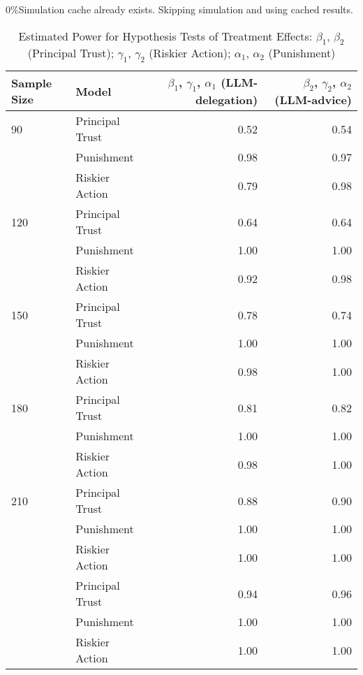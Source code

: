 \documentclass[
]{article}
\begin{document}
\textbar{} \textbar{} \textbar{} 0\%Simulation cache already exists.
Skipping simulation and using cached results.

\begin{table}[!h]

\caption{\label{tab:plot_power}Estimated Power for Hypothesis Tests of Treatment Effects: $\beta_1$, $\beta_2$ (Principal Trust); $\gamma_1$, $\gamma_2$ (Riskier Action); $\alpha_1$, $\alpha_2$ (Punishment)}
\centering
\fontsize{10}{12}\selectfont
\begin{tabular}{llrr}
\toprule
Sample Size & Model & $\beta_1$, $\gamma_1$, $\alpha_1$ (LLM-delegation) & $\beta_2$, $\gamma_2$, $\alpha_2$ (LLM-advice)\\
[1.5ex]
\midrule
90 & Principal Trust & 0.52 & 0.54\\
[1.5ex]
 & Punishment & 0.98 & 0.97\\
[1.5ex]
 & Riskier Action & 0.79 & 0.98\\
[1.5ex]
120 & Principal Trust & 0.64 & 0.64\\
[1.5ex]
 & Punishment & 1.00 & \vphantom{4} 1.00\\
[1.5ex]
\addlinespace
 & Riskier Action & 0.92 & 0.98\\
[1.5ex]
150 & Principal Trust & 0.78 & 0.74\\
[1.5ex]
 & Punishment & 1.00 & \vphantom{3} 1.00\\
[1.5ex]
 & Riskier Action & 0.98 & \vphantom{1} 1.00\\
[1.5ex]
180 & Principal Trust & 0.81 & 0.82\\
[1.5ex]
\addlinespace
 & Punishment & 1.00 & \vphantom{2} 1.00\\
[1.5ex]
 & Riskier Action & 0.98 & 1.00\\
[1.5ex]
210 & Principal Trust & 0.88 & 0.90\\
[1.5ex]
 & Punishment & 1.00 & \vphantom{1} 1.00\\
[1.5ex]
 & Riskier Action & 1.00 & \vphantom{1} 1.00\\
[1.5ex]
\addlinespace
240 & Principal Trust & 0.94 & 0.96\\
[1.5ex]
 & Punishment & 1.00 & 1.00\\
[1.5ex]
 & Riskier Action & 1.00 & 1.00\\
[1.5ex]
\bottomrule
\end{tabular}
\end{table}
\end{document}
